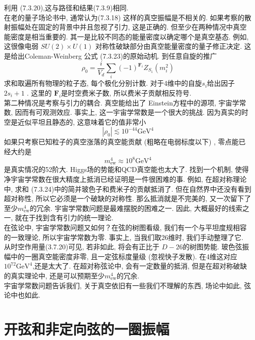 利用 (7.3.20),这与路径和结果(7.3.9)相同.\\
在老的量子场论书中, 通常认为(7.3.18) 这样的真空振幅是不相关的. 如果考察的散射振幅处在固定的背景中并且忽视了引力, 这是正确的. 但至少在两种情况中真空能密度是相当重要的. 其一是比较不同态的能量密度以确定哪个是真空基态. 例如, 这很像电弱 $S U(2) \times U(1)$ 对称性破缺部分由真空能量密度的量子修正决定. 这是给出Coleman-Weinberg 公式 (7.3.23)的原始动机. 到任意自旋的推广
\begin{equation}
	\rho_{0}=\frac{i}{V_{d}} \sum_{i}(-1)^{\mathbf{F}_{i}} Z_{S_{1}}\left(m_{i}^{2}\right)
\end{equation}
求和取遍所有物理的粒子态, 每个极化分别计数. 对于4维中的自旋$s_{i}$给出因子 $2 s_{i}+1$ . 这里的 $\mathbf{F}_{i}$是时空费米子数,  所以费米子贡献相反符号.\\
第二种情况是考察与引力的耦合. 真空能给出了 Einstein方程中的源项, 宇宙学常数, 因而有可观测效应. 事实上, 这一宇宙学常数是一个很大的挑战. 因为真实的时空是近似平坦且静态的, 这意味着它的值非常小
\begin{equation}
	\left|\rho_{0}\right| \lesssim 10^{-44} \mathrm{GeV}^{4}
\end{equation}
如果只考察已知粒子的真空涨落的真空能贡献 (粗略在电弱标度以下) , 零点能已经大约是
\begin{equation}
	m_{\mathrm{ew}}^{4} \approx 10^{8} \mathrm{GeV}^{4}
\end{equation}
是真实情况的52阶大. Higgs场的势能和QCD真空能也太大了. 找到一个机制, 使得净宇宙学常数在很大精度上抵消已经证明是一件很困难的事. 例如, 在超对称理论中, 求和 (7.3.24)中的简并玻色子和费米子的贡献抵消了. 但在自然界中还没有看到超对称性, 所以它必须是一个破缺的对称性. 那么抵消就是不完美的, 又一次留下了至少$m_{\mathrm{ew}}^{4} $的冗余. 宇宙学常数问题是最难摆脱的困难之一. 因此, 大概最好的线索之一, 就在于找到含有引力的统一理论.\\
在弦论中, 宇宙学常数问题又如何？在弦的树图看级, 我们有一个与平坦度规相容的一致理论, 所以宇宙学常数为零. 事实上, 当我们取26维时, 我们手动整理了它. 从时空作用量(3.7.20)可见, 若非如此, 将会有正比于 $D-26$的树图势能. 玻色弦振幅中的一圈真空能密度非零, 且一定弦标度量级 (忽视快子发散). 在4维这对应 $10^{72} \mathrm{GeV}^{4}$,还是太大了. 在超对称弦论中, 会有一定数量的抵消, 但是在超对称破缺的真实理论中, 还是可以预期至少$m_{\mathrm{ew}}^{4}$的冗余.\\
宇宙学常数问题告诉我们, 关于真空依旧有一些我们不理解的东西, 场论中如此, 弦论中也如此.

\section{开弦和非定向弦的一圈振幅}%

